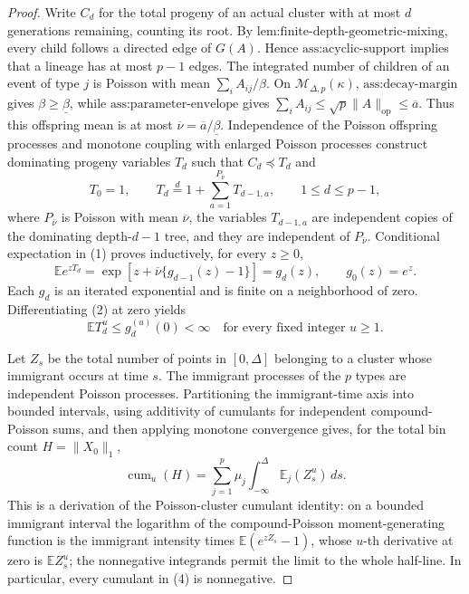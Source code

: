 \documentclass{article}
\begin{document}
\begin{proof}
Write \(C_d\) for the total progeny of an actual cluster with at most \(d\) generations remaining, counting its root.  By \(\text{lem:finite-depth-geometric-mixing}\), every child follows a directed edge of \(G(A)\).  Hence \(\text{ass:acyclic-support}\) implies that a lineage has at most \(p-1\) edges.  The integrated number of children of an event of type \(j\) is Poisson with mean \(\sum_i A_{ij}/\beta\).  On \(\mathcal M_{\Delta,p}(\kappa)\), \(\text{ass:decay-margin}\) gives \(\beta\geq\underline\beta\), while \(\text{ass:parameter-envelope}\) gives \(\sum_iA_{ij}\leq\sqrt p\lVert A\rVert_{\mathrm{op}}\leq\overline a\).  Thus this offspring mean is at most \(\overline\nu=\overline a/\underline\beta\).  Independence of the Poisson offspring processes and monotone coupling with enlarged Poisson processes construct dominating progeny variables \(T_d\) such that \(C_d\preceq T_d\) and
\[
 T_0=1,
 \qquad
 T_d\mathrel{\stackrel{d}{=}} 1+\sum_{a=1}^{P_{\overline\nu}}T_{d-1,a},
 \qquad 1\leq d\leq p-1,
\tag{1}
\]
where \(P_{\overline\nu}\) is Poisson with mean \(\overline\nu\), the variables \(T_{d-1,a}\) are independent copies of the dominating depth-\(d-1\) tree, and they are independent of \(P_{\overline\nu}\).  Conditional expectation in (1) proves inductively, for every \(z\geq0\),
\[
 \mathbb E e^{zT_d}
 = \exp\!\left[z+\overline\nu\{g_{d-1}(z)-1\}\right]
 =g_d(z),
 \qquad g_0(z)=e^z.
\tag{2}
\]
Each \(g_d\) is an iterated exponential and is finite on a neighborhood of zero.  Differentiating (2) at zero yields
\[
 \mathbb E T_d^u\leq g_d^{(u)}(0)<\infty
 \quad\text{for every fixed integer }u\geq1.
\tag{3}
\]

Let \(Z_s\) be the total number of points in \([0,\Delta]\) belonging to a cluster whose immigrant occurs at time \(s\).  The immigrant processes of the \(p\) types are independent Poisson processes.  Partitioning the immigrant-time axis into bounded intervals, using additivity of cumulants for independent compound-Poisson sums, and then applying monotone convergence gives, for the total bin count \(H=\lVert X_0\rVert_1\),
\[
 \operatorname{cum}_u(H)
 =\sum_{j=1}^p\mu_j\int_{-\infty}^{\Delta}
       \mathbb E_j(Z_s^u)\,ds.
\tag{4}
\]
This is a derivation of the Poisson-cluster cumulant identity: on a bounded immigrant interval the logarithm of the compound-Poisson moment-generating function is the immigrant intensity times \(\mathbb E(e^{zZ_s}-1)\), whose \(u\)-th derivative at zero is \(\mathbb E Z_s^u\); the nonnegative integrands permit the limit to the whole half-line.  In particular, every cumulant in (4) is nonnegative.


\end{proof}
\end{document}

